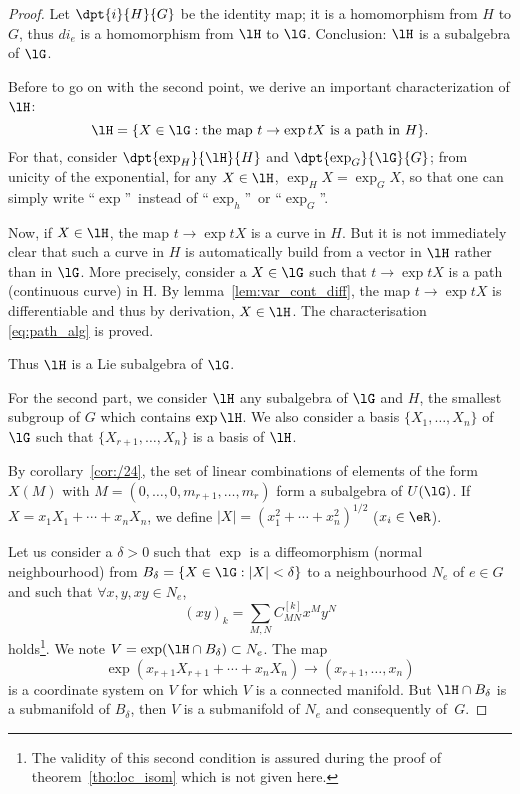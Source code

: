 \begin{proof}

	Let $\dpt{i}{H}{G}$ be the identity map; it is a homomorphism from $H$ to $G$, thus $di_e$ is a homomorphism from $\lH$ to $\lG$. Conclusion: $\lH$ is a subalgebra of $\lG$.

	Before to go on with the second point, we derive an important characterization of $\lH$:
	\begin{equation}\label{eq:path_alg}
		\lH=\{X\in\lG:\text{the map } t\to\exp tX\text{ is a path in $H$}\}.
	\end{equation}
	For that, consider $\dpt{\exp_H}{\lH}{H}$ and $\dpt{\exp_G}{\lG}{G}$; from unicity of the exponential, for any $X\in\lH$, $\exp_HX=\exp_GX$, so that one can simply write ``$\exp$''\ instead of ``$\exp_h$''\ or ``$\exp_G$''.

	Now, if $X\in\lH$, the map $t\to\exp tX$ is a curve in $H$. But it is not immediately clear that such a curve in $H$ is automatically build from a vector in $\lH$ rather than in $\lG$.  More precisely, consider a $X\in\lG$ such that $t\to\exp tX$ is a path (continuous curve) in H. By lemma~\ref{lem:var_cont_diff}, the map $t\to\exp tX$ is differentiable and thus by derivation, $X\in\lH$.
	The characterisation \eqref{eq:path_alg} is proved.

	Thus $\lH$ is a Lie subalgebra of $\lG$.

	For the second part, we consider $\lH$ any subalgebra of $\lG$ and $H$, the smallest subgroup of $G$ which contains $\exp\lH$. We also consider a basis $\{X_1,\ldots,X_n\}$ of $\lG$ such that $\{X_{r+1},\ldots,X_n\}$ is a basis of $\lH$.

	By corollary~\ref{cor:/24}, the set of linear combinations of elements of the form $X(M)$ with $M=(0,\ldots,0,m_{r+1},\ldots,m_r)$ form a subalgebra of $U(\lG)$. If $X=x_1X_1+\cdots+x_nX_n$, we define $|X|=(x_1^2+\cdots+x_n^2)^{1/2}$ ($x_i\in\eR$).

	Let us consider a $\delta>0$ such that $\exp$ is a diffeomorphism (normal neighbourhood) from $B_{\delta}=\{X\in\lG:|X|<\delta\}$ to a neighbourhood $N_e$ of $e\in G$ and such that $\forall x,y,xy\in N_e$,
	\begin{equation}\label{eq:coord_xy}
		(xy)_k=\sum_{M,N}C^{[k]}_{MN}x^My^N
	\end{equation}
	holds\footnote{The validity of this second condition is assured during the proof of theorem~\ref{tho:loc_isom} which is not given here.}. We note $V=\exp(\lH\cap B_{\delta})\subset N_e$. The map
	\[
		\exp(x_{r+1}X_{r+1}+\cdots+x_nX_n)\to(x_{r+1},\ldots,x_n)
	\]
	is a coordinate system on $V$ for which $V$ is a connected manifold. But $\lH\cap B_{\delta}$ is a submanifold of $B_{\delta}$, then $V$ is a submanifold of $N_e$ and consequently of~$G$.


\end{proof}

